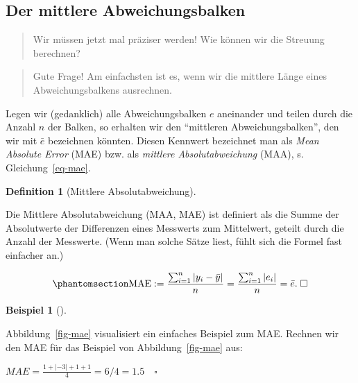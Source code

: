 \documentclass[
  letterpaper,
  twoside,
  open=any]{scrbook}
\theoremstyle{definition}
\newtheorem{definition}{Definition}[chapter]
\theoremstyle{definition}
\theoremstyle{definition}
\newtheorem{example}{Beispiel}[chapter]
\theoremstyle{remark}
\begin{document}
\subsection{Der mittlere
Abweichungsbalken}\label{der-mittlere-abweichungsbalken}

\begin{quote}
{} Wir müssen jetzt mal präziser werden! Wie können wir
die Streuung berechnen?
\end{quote}

\begin{quote}
{} Gute Frage! Am einfachsten ist es, wenn wir die
mittlere Länge eines Abweichungsbalkens ausrechnen.
\end{quote}

Legen wir (gedanklich) alle Abweichungsbalken \(e\) aneinander und
teilen durch die Anzahl \(n\) der Balken, so erhalten wir den
\enquote{mittleren Abweichungsbalken}, den wir mit \(\bar{e}\)
bezeichnen könnten. Diesen Kennwert bezeichnet man als \emph{Mean
Absolute Error} (MAE) bzw. als \emph{mittlere Absolutabweichung} (MAA),
s. Gleichung~\ref{eq-mae}.

\begin{definition}[Mittlere
Absolutabweichung]\protect\hypertarget{def-mae}{}\label{def-mae}

Die Mittlere Absolutabweichung (MAA, MAE) ist definiert als die Summe
der Absolutwerte der Differenzen eines Messwerts zum Mittelwert, geteilt
durch die Anzahl der Messwerte. (Wenn man solche Sätze liest, fühlt sich
die Formel fast einfacher an.)

\begin{equation}\phantomsection\label{eq-mae}{{\displaystyle \mathrm {MAE} :={\frac {\sum _{i=1}^{n}\left|y_{i}-\bar{y}\right|}{n}}={\frac {\sum _{i=1}^{n}\left|e_{i}\right|}{n}}=\bar{e}.  \; \square}}\end{equation}

\end{definition}

\begin{example}[]\protect\hypertarget{exm-mae}{}\label{exm-mae}

Abbildung~\ref{fig-mae} visualisiert ein einfaches Beispiel zum MAE.
Rechnen wir den MAE für das Beispiel von Abbildung~\ref{fig-mae} aus:

\(MAE = \frac{1 + |- 3| + 1 + 1}{4} = 6/4 = 1.5 \quad \square\)

\end{example}
\end{document}
